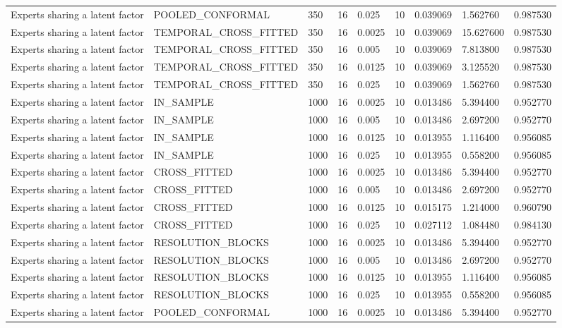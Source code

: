 \begin{tabular}{lllllllll}
Experts sharing a latent factor & POOLED\_CONFORMAL & 350 & 16 & 0.025 & 10 & 0.039069 & 1.562760 & 0.987530 \\
Experts sharing a latent factor & TEMPORAL\_CROSS\_FITTED & 350 & 16 & 0.0025 & 10 & 0.039069 & 15.627600 & 0.987530 \\
Experts sharing a latent factor & TEMPORAL\_CROSS\_FITTED & 350 & 16 & 0.005 & 10 & 0.039069 & 7.813800 & 0.987530 \\
Experts sharing a latent factor & TEMPORAL\_CROSS\_FITTED & 350 & 16 & 0.0125 & 10 & 0.039069 & 3.125520 & 0.987530 \\
Experts sharing a latent factor & TEMPORAL\_CROSS\_FITTED & 350 & 16 & 0.025 & 10 & 0.039069 & 1.562760 & 0.987530 \\
Experts sharing a latent factor & IN\_SAMPLE & 1000 & 16 & 0.0025 & 10 & 0.013486 & 5.394400 & 0.952770 \\
Experts sharing a latent factor & IN\_SAMPLE & 1000 & 16 & 0.005 & 10 & 0.013486 & 2.697200 & 0.952770 \\
Experts sharing a latent factor & IN\_SAMPLE & 1000 & 16 & 0.0125 & 10 & 0.013955 & 1.116400 & 0.956085 \\
Experts sharing a latent factor & IN\_SAMPLE & 1000 & 16 & 0.025 & 10 & 0.013955 & 0.558200 & 0.956085 \\
Experts sharing a latent factor & CROSS\_FITTED & 1000 & 16 & 0.0025 & 10 & 0.013486 & 5.394400 & 0.952770 \\
Experts sharing a latent factor & CROSS\_FITTED & 1000 & 16 & 0.005 & 10 & 0.013486 & 2.697200 & 0.952770 \\
Experts sharing a latent factor & CROSS\_FITTED & 1000 & 16 & 0.0125 & 10 & 0.015175 & 1.214000 & 0.960790 \\
Experts sharing a latent factor & CROSS\_FITTED & 1000 & 16 & 0.025 & 10 & 0.027112 & 1.084480 & 0.984130 \\
Experts sharing a latent factor & RESOLUTION\_BLOCKS & 1000 & 16 & 0.0025 & 10 & 0.013486 & 5.394400 & 0.952770 \\
Experts sharing a latent factor & RESOLUTION\_BLOCKS & 1000 & 16 & 0.005 & 10 & 0.013486 & 2.697200 & 0.952770 \\
Experts sharing a latent factor & RESOLUTION\_BLOCKS & 1000 & 16 & 0.0125 & 10 & 0.013955 & 1.116400 & 0.956085 \\
Experts sharing a latent factor & RESOLUTION\_BLOCKS & 1000 & 16 & 0.025 & 10 & 0.013955 & 0.558200 & 0.956085 \\
Experts sharing a latent factor & POOLED\_CONFORMAL & 1000 & 16 & 0.0025 & 10 & 0.013486 & 5.394400 & 0.952770 \\

\end{tabular}
